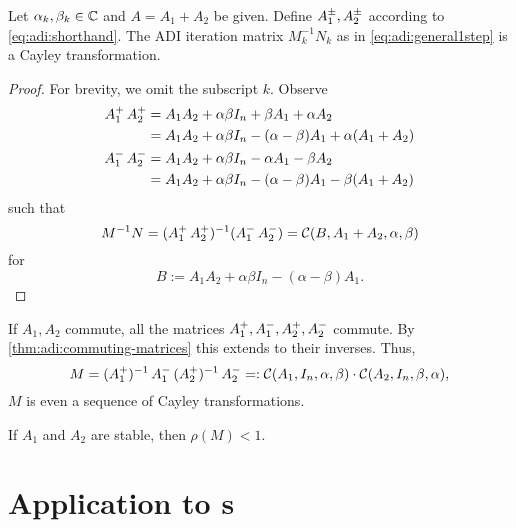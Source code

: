 \begin{lemma}
  Let $\alpha_k,\beta_k\in\mathbb{C}$ and $A=A_1+A_2$ be given.
  Define $\mathop{A_1^\pm}, \mathop{A_2^\pm}$ according to \eqref{eq:adi:shorthand}.
  The \ac{ADI} iteration matrix $M_k^{-1}N_k$ as in \eqref{eq:adi:general1step} is a Cayley transformation.
\end{lemma}
\begin{proof}
  For brevity, we omit the subscript $k$.
  Observe
  \begin{align*}
    \mathop{A_1^+}\mathop{A_2^+}
    &= A_1A_2 + \alpha\beta I_n + \beta A_1 + \alpha A_2 \\
    &= A_1A_2 + \alpha\beta I_n - (\alpha-\beta)A_1 + \alpha(A_1 + A_2) \\
    \mathop{A_1^-}\mathop{A_2^-}
    &= A_1A_2 + \alpha\beta I_n - \alpha A_1 - \beta A_2 \\
    &= A_1A_2 + \alpha\beta I_n - (\alpha-\beta)A_1 - \beta(A_1 + A_2)
  \end{align*}
  such that
  \begin{equation*}
    M^{-1}N
    = (\mathop{A_1^+}\mathop{A_2^+})^{-1}(\mathop{A_1^-}\mathop{A_2^-})
    = \mathcal{C}(B, A_1+A_2, \alpha, \beta)
  \end{equation*}
  for
  \begin{equation*}
    B := A_1A_2 + \alpha\beta I_n - (\alpha-\beta)A_1
    .
  \end{equation*}
\end{proof}

If $A_1, A_2$ commute,
all the matrices $\mathop{A_1^+},\mathop{A_1^-},\mathop{A_2^+},\mathop{A_2^-}$ commute.
By \autoref{thm:adi:commuting-matrices} this extends to their inverses.
Thus,
\begin{equation*}
  M =
  \mathop{(\mathop{A_1^+})^{-1}}\mathop{A_1^-}
  \mathop{(\mathop{A_2^+})^{-1}}\mathop{A_2^-}
  =:
  \mathcal{C}(A_1, I_n, \alpha, \beta)
  \cdot
  \mathcal{C}(A_2, I_n, \beta, \alpha)
  ,
\end{equation*}
\ie $M$ is even a sequence of Cayley transformations.

\begin{hypothesis}
\label{thm:adi:convergence}
  If $A_1$ and $A_2$ are stable, then $\rho(M) < 1$.
\end{hypothesis}

\section{Application to s}
\label{sec:adi:ale}

